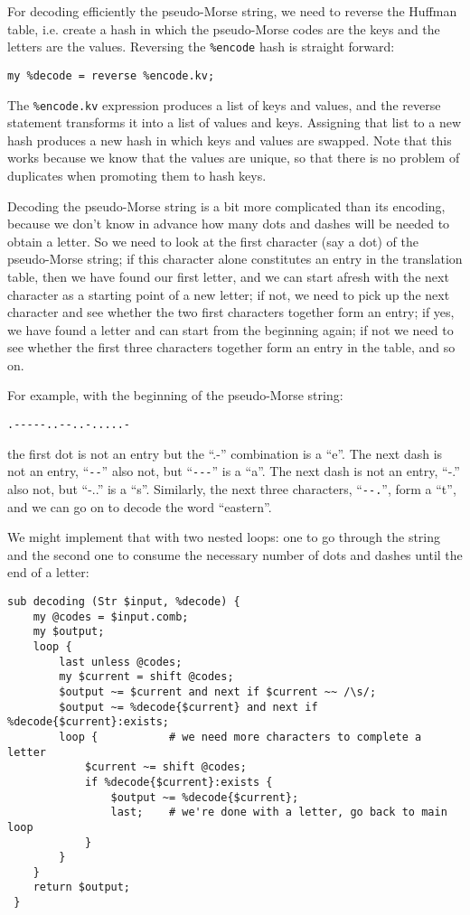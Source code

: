 For decoding efficiently the pseudo-Morse string, we need to reverse 
the Huffman table, i.e. create a hash in which the pseudo-Morse codes 
are the keys and the letters are the values. Reversing the \verb'%encode' 
hash is straight forward:

\begin{verbatim}
my %decode = reverse %encode.kv;
\end{verbatim}

The \verb'%encode.kv' expression produces a list of keys and values, 
and the reverse statement transforms it into a list of values and 
keys. Assigning that list to a new hash produces a new hash in 
which keys and values are swapped. Note that this works because 
we know that the values are unique, so that there is no problem 
of duplicates when promoting them to hash keys.

Decoding the pseudo-Morse string is a bit more complicated than 
its encoding, because we don't know in advance how many dots and 
dashes will be needed to obtain a letter. So we need to look at the 
first character (say a dot) of the pseudo-Morse string; if this 
character alone constitutes an entry in the translation table, 
then we have found our first 
letter, and we can start afresh with the next character as a starting 
point of a new letter; if not, we need to pick up the next character 
and see whether the two first characters together form an entry; if yes, 
we have found a letter and can start from the beginning again; if 
not we need to see whether the first three characters together form an 
entry in the table, and so on.

For example, with the beginning of the pseudo-Morse string:
\begin{verbatim}
.-----..--..-.....-
\end{verbatim}
the first dot is not an entry but the ``.-'' combination is a ``e''.
The next dash is not an entry, ``\verb"--"'' also not, but 
``\verb"---"'' is a ``a''.
The next dash is not an entry, ``-.'' also not, but ``-..'' is a ``s''. 
Similarly, the next three characters, ``\verb"--."'', form a ``t'', and we 
can go on to decode the word ``eastern''.

We might implement that with two nested loops: one to go through the 
string and the second one to consume the necessary number of dots and 
dashes until the end of a letter:

\begin{verbatim}
sub decoding (Str $input, %decode) {
    my @codes = $input.comb;
    my $output;
    loop {
        last unless @codes;
        my $current = shift @codes;
        $output ~= $current and next if $current ~~ /\s/;
        $output ~= %decode{$current} and next if %decode{$current}:exists;
        loop {           # we need more characters to complete a letter
            $current ~= shift @codes;
            if %decode{$current}:exists {
                $output ~= %decode{$current};
                last;    # we're done with a letter, go back to main loop
            }
        }
    }
    return $output;
 }
\end{verbatim}

